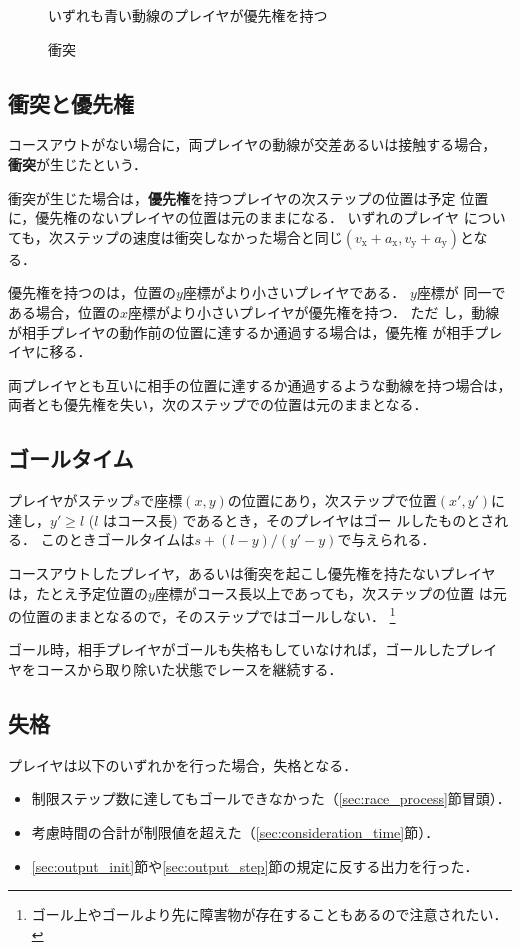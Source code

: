 \documentclass[11pt]{jarticle}
\newcommand\secref[1]{\mbox{\ref{#1}節}}
\begin{document}
\begin{figure}
  \caption{衝突}
  \label{fig:collision}
  いずれも青い動線のプレイヤが優先権を持つ
  \vspace{-1.5cm}
\end{figure}

\subsection{衝突と優先権}
コースアウトがない場合に，両プレイヤの動線が交差あるいは接触する場合，
{\bf 衝突}が生じたという．

衝突が生じた場合は，{\bf 優先権}を持つプレイヤの次ステップの位置は予定
位置に，優先権のないプレイヤの位置は元のままになる．  いずれのプレイヤ
についても，次ステップの速度は衝突しなかった場合と同じ$(v_\mathrm{x}+a_\mathrm{x},
v_\mathrm{y}+a_\mathrm{y})$となる．

優先権を持つのは，位置の$y$座標がより小さいプレイヤである．  $y$座標が
同一である場合，位置の$x$座標がより小さいプレイヤが優先権を持つ． ただ
し，動線が相手プレイヤの動作前の位置に達するか通過する場合は，優先権
が相手プレイヤに移る．

両プレイヤとも互いに相手の位置に達するか通過するような動線を持つ場合は，
両者とも優先権を失い，次のステップでの位置は元のままとなる．

\subsection{ゴールタイム}
プレイヤがステップ$s$で座標$(x, y)$の位置にあり，次ステップで位置$(x',
y')$に達し，$y'\ge l$ ($l$ はコース長) であるとき，そのプレイヤはゴー
ルしたものとされる．  このときゴールタイムは$s + (l-y)/(y'-y)$で与えられる．

コースアウトしたプレイヤ，あるいは衝突を起こし優先権を持たないプレイヤ
は，たとえ予定位置の$y$座標がコース長以上であっても，次ステップの位置
は元の位置のままとなるので，そのステップではゴールしない．
\footnote{ゴール上やゴールより先に障害物が存在することもあるので注意されたい．}

ゴール時，相手プレイヤがゴールも失格もしていなければ，ゴールしたプレイ
ヤをコースから取り除いた状態でレースを継続する．

\subsection{失格}\label{sec:disqualification}
プレイヤは以下のいずれかを行った場合，失格となる．
\begin{itemize}
\item 制限ステップ数に達してもゴールできなかった（\secref{sec:race_process}冒頭）．
\item 考慮時間の合計が制限値を超えた（\secref{sec:consideration_time}）．
\item \secref{sec:output_init}や\secref{sec:output_step}の規定に反する出力を行った．
\end{itemize}
\end{document}
